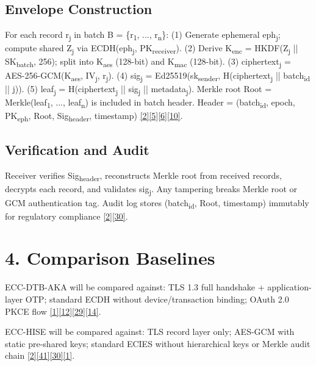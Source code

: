 \subsection{Envelope Construction}

\indent For each record r\textsubscript{j} in batch B = \{r\textsubscript{1}, ..., r\textsubscript{n}\}: (1) Generate ephemeral eph\textsubscript{j}; compute shared Z\textsubscript{j} via ECDH(eph\textsubscript{j}, PK\textsubscript{receiver}). (2) Derive K\textsubscript{enc} = HKDF(Z\textsubscript{j} || SK\textsubscript{batch}, 256); split into K\textsubscript{aes} (128-bit) and K\textsubscript{mac} (128-bit). (3) ciphertext\textsubscript{j} = AES-256-GCM(K\textsubscript{aes}, IV\textsubscript{j}, r\textsubscript{j}). (4) sig\textsubscript{j} = Ed25519(sk\textsubscript{sender}, H(ciphertext\textsubscript{j} || batch\textsubscript{id} || j)). (5) leaf\textsubscript{j} = H(ciphertext\textsubscript{j} || sig\textsubscript{j} || metadata\textsubscript{j}). Merkle root Root = Merkle(leaf\textsubscript{1}, ..., leaf\textsubscript{n}) is included in batch header. Header = (batch\textsubscript{id}, epoch, PK\textsubscript{eph}, Root, Sig\textsubscript{header}, timestamp) \hyperref[ref:2]{[2]}\hyperref[ref:5]{[5]}\hyperref[ref:6]{[6]}\hyperref[ref:10]{[10]}.

\subsection{Verification and Audit}

\indent Receiver verifies Sig\textsubscript{header}, reconstructs Merkle root from received records, decrypts each record, and validates sig\textsubscript{j}. Any tampering breaks Merkle root or GCM authentication tag. Audit log stores (batch\textsubscript{id}, Root, timestamp) immutably for regulatory compliance \hyperref[ref:2]{[2]}\hyperref[ref:30]{[30]}.

\section{4. Comparison Baselines}

\indent ECC-DTB-AKA will be compared against: TLS 1.3 full handshake + application-layer OTP; standard ECDH without device/transaction binding; OAuth 2.0 PKCE flow \hyperref[ref:1]{[1]}\hyperref[ref:12]{[12]}\hyperref[ref:29]{[29]}\hyperref[ref:14]{[14]}.

\indent ECC-HISE will be compared against: TLS record layer only; AES-GCM with static pre-shared keys; standard ECIES without hierarchical keys or Merkle audit chain \hyperref[ref:2]{[2]}\hyperref[ref:41]{[41]}\hyperref[ref:30]{[30]}\hyperref[ref:1]{[1]}.

